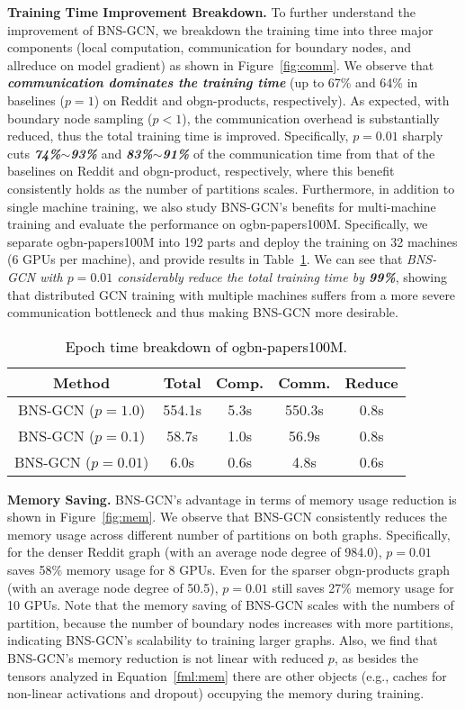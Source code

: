\documentclass{article}
\newcommand{\niparagraph}[1]{\noindent\textbf{#1}}
\begin{document}
\niparagraph{Training Time Improvement Breakdown.} 
To further understand the improvement of BNS-GCN, we breakdown the training time into three major components (local computation, communication for boundary nodes, and allreduce on model gradient) as shown in Figure~\ref{fig:comm}.
We observe that \textit{\textbf{communication dominates the training time}} (up to 67\% and 64\% in baselines ($p=1$) on Reddit and obgn-products, respectively). 
As expected, with boundary node sampling ($p<1$), the communication overhead is substantially reduced, thus the total training time is improved. 
Specifically, $p=0.01$ sharply cuts \textbf{\textit{74\%$\sim$93\%}} and \textbf{\textit{83\%$\sim$91\%}} of the communication time from that of the baselines on Reddit and obgn-product, respectively, where this benefit consistently holds as the number of partitions scales.
Furthermore, in addition to single machine training, we also study BNS-GCN's benefits for multi-machine training and evaluate the performance on ogbn-papers100M. 
Specifically, 
we separate ogbn-papers100M into 192 parts and deploy the training on 32 machines (6 GPUs per machine), and provide results in Table~\ref{tab:papers100m}. We can see that
\textit{BNS-GCN with $p=0.01$ considerably reduce the total training time by \textbf{99\%}}, showing that distributed GCN training with multiple machines suffers from a more severe communication bottleneck and thus making BNS-GCN more desirable.

\begin{table}[t]
\centering
\caption{\textcolor{black}{Epoch time breakdown of ogbn-papers100M.
}}
\setlength{\tabcolsep}{0.3em}
\label{tab:papers100m}
\begin{tabular}{c|cccc}
\hline
Method & Total & Comp. & Comm. & Reduce \\ \hline
BNS-GCN ($p=1.0$) & 554.1s & 5.3s & 550.3s & 0.8s \\
BNS-GCN ($p=0.1$) & 58.7s & 1.0s & 56.9s & 0.8s \\
BNS-GCN ($p=0.01$) & 6.0s & 0.6s & 4.8s & 0.6s \\
\hline
\end{tabular}
\end{table}

\niparagraph{Memory Saving.} 
BNS-GCN's advantage in terms of memory usage reduction is shown in Figure~\ref{fig:mem}.
We observe that BNS-GCN consistently reduces the memory usage across different number of partitions on both graphs. 
Specifically, for the denser Reddit graph (with an average node degree of 984.0), $p=0.01$ saves 58\% memory usage for 8 GPUs. 
Even for the sparser obgn-products graph (with an average node degree of 50.5), $p=0.01$ still saves 27\% memory usage for 10 GPUs. 
Note that the memory saving of BNS-GCN scales with the numbers of partition, because the number of boundary nodes increases with more partitions, indicating BNS-GCN's scalability to training larger graphs.
Also, we find that BNS-GCN's memory reduction is not linear with reduced $p$, as besides the tensors analyzed in Equation~\ref{fml:mem} there are other objects (e.g., caches for non-linear activations and dropout) occupying the memory during training.
\end{document}
